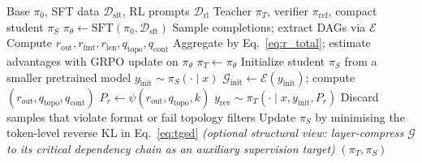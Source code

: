 \begin{algorithm}[!htb]
\caption{\framework Training Pipeline (SFT $\to$ GRPO $\to$ TG-OPD)}
\label{alg:topoprm}
\begin{algorithmic}[1]
\Require Base $\pi_0$, SFT data $\mathcal{D}_{\mathrm{sft}}$, RL prompts $\mathcal{D}_{\mathrm{rl}}$
\Ensure Teacher $\pi_T$, verifier $\pi_{\mathrm{ref}}$, compact student $\pi_S$
\State $\pi_\theta \leftarrow \mathrm{SFT}(\pi_0,\mathcal{D}_{\mathrm{sft}})$ 
 
  \State Sample completions; extract DAGs via $\mathcal{E}$
  \State Compute $r_{\mathrm{out}},r_{\mathrm{fmt}},r_{\mathrm{len}},q_{\mathrm{topo}},q_{\mathrm{cont}}$
  \State Aggregate by Eq.~\ref{eq:r_total}; estimate advantages with \estimation
  \State GRPO update on $\pi_\theta$
\EndFor
\State $\pi_T \leftarrow \pi_\theta$ 
 
  \State Initialize student $\pi_S$ from a smaller pretrained model
    \State $y_{\mathrm{init}} \sim \pi_S(\cdot\mid x)$ 
    \State $\mathcal{G}_{\mathrm{init}} \leftarrow \mathcal{E}(y_{\mathrm{init}})$; compute $(r_{\mathrm{out}}, q_{\mathrm{topo}}, q_{\mathrm{cont}})$
    \State $P_r \leftarrow \psi(r_{\mathrm{out}}, q_{\mathrm{topo}}, k)$ 
    \State $y_{\mathrm{rev}} \sim \pi_T(\cdot\mid x, y_{\mathrm{init}}, P_r)$ 
    \State Discard samples that violate format or fail topology filters
    \State Update $\pi_S$ by minimising the token-level reverse KL in Eq.~\ref{eq:tgsd}
    \Statex \hspace{1em}\textit{(optional structural view: layer-compress $\mathcal{G}$ to its critical dependency chain as an auxiliary supervision target)}
  \EndFor
\EndIf
\State \Return $(\pi_T, \pi_S)$
\end{algorithmic}
\end{algorithm}

